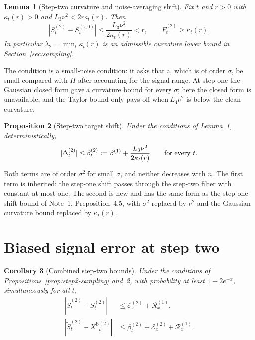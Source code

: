 \documentclass[11pt]{article}
\newcommand{\eqdef}{\mathrel{\vcentcolon=}}
\newcommand{\IMFs}{S}
\newcommand{\IMFt}{\widetilde S}
\newcommand{\BiasedSignal}{X^{\mathrm b}}
\newcommand{\IF}{F}
\newtheorem{proposition}{Proposition}
\newtheorem{lemma}[proposition]{Lemma}
\newtheorem{corollary}[proposition]{Corollary}
\theoremstyle{definition}
\begin{document}
\begin{lemma}[Step-two curvature and noise-averaging shift]\label{lem:curvature}
Fix \(t\) and \(r>0\) with \(\kappa_t(r)>0\) and
\(L_3\nu^2<2r\kappa_t(r)\).  Then
\begin{equation}
  |\IMFs^{(2)}_t-\IMFs^{(2,0)}_t|\leq\frac{L_3\nu^2}{2\kappa_t(r)}<r,
  \qquad
  \bar\IF^{(2)}_t\geq\kappa_t(r).
  \label{eq:curvature-shift}
\end{equation}
In particular \(\lambda_2=\min_t\kappa_t(r)\) is an admissible curvature
lower bound in Section~\ref{sec:sampling}.
\end{lemma}

The condition is a small-noise condition: it asks that \(\nu\), which is of
order \(\sigma\), be small compared with \(H\) after accounting for the
signal range.  At step one the Gaussian closed form gave a curvature bound
for every \(\sigma\); here the closed form is unavailable, and the Taylor
bound only pays off when \(L_4\nu^2\) is below the clean curvature.

\begin{proposition}[Step-two target shift]\label{prop:step2-shift}
Under the conditions of Lemma~\ref{lem:curvature}, deterministically,
\begin{equation}
  |\Delta^{(2)}_t|\leq\beta^{(2)}_t
  \eqdef\beta^{(1)}+\frac{L_3\nu^2}{2\kappa_t(r)}
  \qquad\text{for every }t.
  \label{eq:step2-shift-bound}
\end{equation}
\end{proposition}

Both terms are of order \(\sigma^2\) for small \(\sigma\), and neither
decreases with \(n\).  The first term is inherited: the step-one shift
passes through the step-two filter with constant at most one.  The second is
new and has the same form as the step-one shift bound of Note~1,
Proposition~4.5, with \(\sigma^2\) replaced by \(\nu^2\) and the Gaussian
curvature bound replaced by \(\kappa_t(r)\).

\section{Biased signal error at step two}\label{sec:biased}

\begin{corollary}[Combined step-two bounds]\label{cor:step2-biased}
Under the conditions of Propositions~\ref{prop:step2-sampling}
and~\ref{prop:step2-shift}, with probability at least \(1-2e^{-x}\),
simultaneously for all \(t\),
\begin{align}
  |\IMFt^{(2)}_t-\IMFs^{(2)}_t|
    &\leq\mathcal E^{(2)}_x+\mathcal R^{(1)}_x,
    \label{eq:final-step2-population}\\
  |\IMFt^{(2)}_t-\BiasedSignal{}^{(2)}_t|
    &\leq\beta^{(2)}_t+\mathcal E^{(2)}_x+\mathcal R^{(1)}_x.
    \label{eq:final-step2-biased}
\end{align}
\end{corollary}
\end{document}
